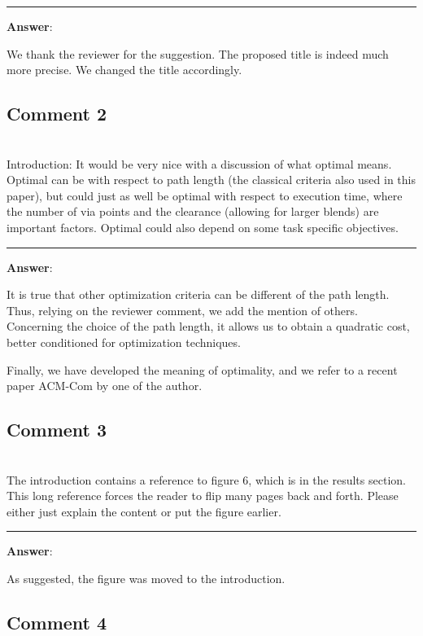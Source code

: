 \documentclass{scrartcl}
\begin{document}
\rule{\linewidth}{.1pt}
\textbf{Answer}:

We thank the reviewer for the suggestion. The proposed title is indeed much more precise. We changed the title accordingly.

\subsection{Comment 2}
\hrulefill\\

Introduction: 
It would be very nice with a discussion of what optimal means. Optimal can be with respect to path length (the classical criteria also used in this paper), but could just as well be optimal with respect to execution time, where the number of via points and the clearance (allowing for larger blends) are important factors. Optimal could also depend on some task specific objectives. 

\rule{\linewidth}{.1pt}
\textbf{Answer}:

It is true that other optimization criteria can be different of the path length. 
Thus, relying on the reviewer comment, we add the mention of others. Concerning 
the choice of the path length, it allows us to obtain a quadratic cost, better 
conditioned for optimization techniques.

Finally, we have developed the meaning of optimality, and we refer to a 
recent paper ACM-Com by one of the author.

\subsection{Comment 3}
\hrulefill\\

The introduction contains a reference to figure 6, which is in the results section. This long reference forces the reader to flip many pages back and forth. Please either just explain the content or put the figure earlier.

\rule{\linewidth}{.1pt}
\textbf{Answer}:

As suggested, the figure was moved to the introduction.

\subsection{Comment 4}
\hrulefill\\
\end{document}
